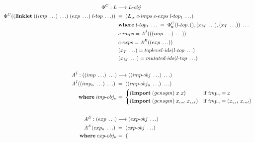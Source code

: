 \documentclass[sigplan,screen,anonymous]{acmart}
\def\dash {\text{-}}
\begin{document}






\begin{figure}[tbp]
  \small
  \begin{align*}
    \Phi^C : L &\longrightarrow L\dash obj \\
    \Phi^C((\textbf{linklet}\; ((imp\; \ldots)\; \ldots)\; (exp\; \ldots)\; l\dash top\; \ldots))\; &=\; (\la\; c\dash imps\; c\dash exps\; l\dash top_1\; \ldots) \\
    \;        &\; \where l\dash top_1\; \ldots\; =\; \Phi^C_{\textbf{e}}(l\dash top,(),(x_M\;\ldots),(x_T\;\ldots))\; \ldots \\
    \;        &\; c\dash imps = \mathit{A}^I(((imp\; \ldots)\; \ldots)) \\
    \;        &\; c\dash exps = \mathit{A}^E((exp\; \ldots)) \\
    \;        &\; (x_T\;\ldots) = toplevel\dash ids(l\dash top\; \ldots) \\
    \;        &\; (x_M\;\ldots) = mutated\dash ids(l\dash top\; \ldots) \\ \\
    \mathit{A}^I : ((imp\; \ldots)\; \ldots) &\longrightarrow ((imp\dash obj\; \ldots)\; \ldots) \\
    \mathit{A}^I((imp_n\; \ldots)\; \ldots)\; &=\; ((imp\dash obj_n\; \ldots)\; \ldots) \\
    \;   \where imp\dash obj_n  &=\; \begin{cases*}
      (\textbf{Import}\;(gensym)\;x\;x) & if $imp_n = x$ \\
      (\textbf{Import}\;(gensym)\;x_{int}\;x_{ext}) & if $imp_n = (x_{ext}\;x_{int})$ \\
    \end{cases*} \\ \\
    \mathit{A}^E : (exp\; \ldots) &\longrightarrow (exp\dash obj\; \ldots) \\
    \mathit{A}^E(exp_n\; \ldots)\; &=\; (exp\dash obj\; \ldots) \\
    \;   \where exp\dash obj_n  &=\; \begin{cases*}

\end{cases*}
\end{align*}
\end{figure}
\end{document}

